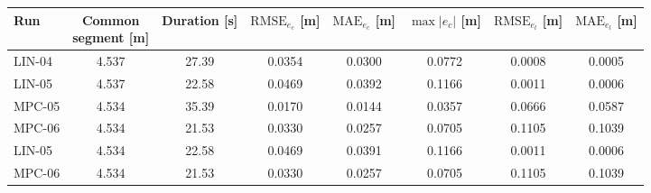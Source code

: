 \begin{tabular}{lccccccc}
\toprule
\textbf{Run} &
\shortstack{\textbf{Common}\\\textbf{segment [m]}} &
\textbf{Duration [s]} &
\(\mathrm{RMSE}_{e_c}\) [m] &
\(\mathrm{MAE}_{e_c}\) [m] &
\(\max |e_c|\) [m] &
\(\mathrm{RMSE}_{e_l}\) [m] &
\(\mathrm{MAE}_{e_l}\) [m] \\
\midrule
LIN-04 & 4.537 & 27.39 & 0.0354 & 0.0300 & 0.0772 & 0.0008 & 0.0005 \\
LIN-05 & 4.537 & 22.58 & 0.0469 & 0.0392 & 0.1166 & 0.0011 & 0.0006 \\
\midrule
MPC-05 & 4.534 & 35.39 & 0.0170 & 0.0144 & 0.0357 & 0.0666 & 0.0587 \\
MPC-06 & 4.534 & 21.53 & 0.0330 & 0.0257 & 0.0705 & 0.1105 & 0.1039 \\
\midrule
LIN-05 & 4.534 & 22.58 & 0.0469 & 0.0391 & 0.1166 & 0.0011 & 0.0006 \\
MPC-06 & 4.534 & 21.53 & 0.0330 & 0.0257 & 0.0705 & 0.1105 & 0.1039 \\
\bottomrule
\end{tabular}
